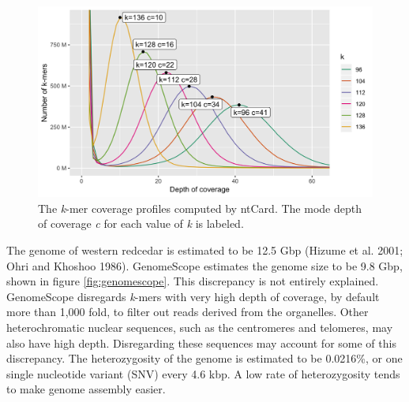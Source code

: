 \documentclass[
  12pt,
  oneside,
  openany]{book}
\begin{document}
\begin{figure}
\hypertarget{fig:ntcard}{%
\centering
\includegraphics{redcedar/ntcard.png}
\caption[The \emph{k}-mer coverage profiles computed by ntCard.]{The \emph{k}-mer coverage profiles computed by ntCard. The mode depth of coverage \emph{c} for each value of \emph{k} is labeled.}\label{fig:ntcard}
}
\end{figure}

The genome of western redcedar is estimated to be 12.5 Gbp (Hizume et al. 2001; Ohri and Khoshoo 1986). GenomeScope estimates the genome size to be 9.8 Gbp, shown in figure \cref{fig:genomescope}. This discrepancy is not entirely explained. GenomeScope disregards \emph{k}-mers with very high depth of coverage, by default more than 1,000 fold, to filter out reads derived from the organelles. Other heterochromatic nuclear sequences, such as the centromeres and telomeres, may also have high depth. Disregarding these sequences may account for some of this discrepancy. The heterozygosity of the genome is estimated to be 0.0216\%, or one single nucleotide variant (SNV) every 4.6 kbp. A low rate of heterozygosity tends to make genome assembly easier.
\end{document}

